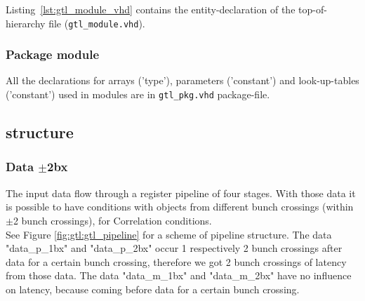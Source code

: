 Listing~\ref{lst:gtl_module_vhd} contains the entity-declaration of the top-of-hierarchy file (\texttt{gtl\_module.vhd}).



\subsubsection{Package module}
\label{sec:gtl:package_module}

All the declarations for arrays ('type'), parameters ('constant') and look-up-tables ('constant') used in modules are in \texttt{gtl\_pkg.vhd} package-file.

\clearpage

\subsection{\ugtl structure}
\label{sec:gtl:mgtl_structure}

\subsubsection{Data $\pm$2bx}
\label{sec:gtl:data_p_m_2bx}

The \ugtl input data flow through a register pipeline of four stages. With those data it is possible to have conditions with objects from
different bunch crossings (within $\pm$2 bunch crossings), \eg for Correlation conditions.\\
See Figure \ref{fig:gtl:gtl_pipeline} for a scheme of \ugtl pipeline structure. The data "data\_p\_1bx" and "data\_p\_2bx" occur 1 respectively 2 bunch crossings
after data for a certain bunch crossing, therefore we got 2 bunch crossings of latency from those data. The data "data\_m\_1bx" and "data\_m\_2bx" have no influence
on latency, because coming before data for a certain bunch crossing.

